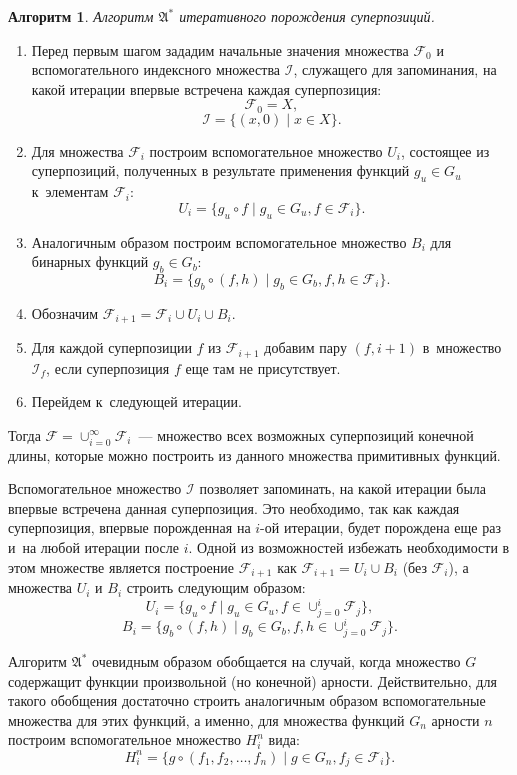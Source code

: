 \documentclass[12pt,a4paper]{amsart}
\newtheorem{algo}{Алгоритм}
\begin{document}
\begin{algo}
  Алгоритм $\mathfrak{A^*}$ итеративного порождения суперпозиций.
\end{algo}
\begin{enumerate}
  \item Перед первым шагом зададим начальные значения множества
	$\mathcal{F}_0$ и вспомогательного индексного множества $\mathcal{I}$,
	служащего для запоминания, на какой итерации впервые встречена
	каждая суперпозиция:
	\[
	  \mathcal{F}_0 = X,
	\]
	\[
	  \mathcal{I} = \{ (x, 0) \mid x \in X \}.
	\]
  \item Для множества $\mathcal{F}_i$ построим вспомогательное множество $U_i$,
	состоящее из суперпозиций, полученных в результате применения функций
	$g_u \in G_u$ к~элементам $\mathcal{F}_i$:
	\[
	  U_i = \{ g_u \circ f \mid g_u \in G_u, f \in \mathcal{F}_i \}.
	\]
  \item Аналогичным образом построим вспомогательное множество $B_i$ для
	бинарных функций $g_b \in G_b$:
	\[
	  B_i = \{ g_b \circ (f, h) \mid g_b \in G_b, f, h \in \mathcal{F}_i \}.
	\]
  \item Обозначим $\mathcal{F}_{i+1} = \mathcal{F}_i \cup U_i \cup B_i$.
  \item Для каждой суперпозиции $f$ из $\mathcal{F}_{i+1}$ добавим пару
	$(f, i+1)$ в~множество $\mathcal{I}_f$, если суперпозиция $f$ еще там
	не присутствует.
  \item Перейдем к~следующей итерации. 
\end{enumerate}

Тогда $\mathcal{F} = \cup_{i=0}^\infty \mathcal{F}_i$~--- множество всех
возможных суперпозиций конечной длины, которые можно построить из
данного множества примитивных функций.

Вспомогательное множество $\mathcal{I}$ позволяет запоминать, на какой
итерации была впервые встречена данная суперпозиция. Это необходимо, так
как каждая суперпозиция, впервые порожденная на $i$-ой итерации, будет
порождена еще раз и~на любой итерации после $i$. Одной из возможностей
избежать необходимости в этом множестве является построение
$\mathcal{F}_{i+1}$ как $\mathcal{F}_{i+1} = U_i \cup B_i$ (без
$\mathcal{F}_i$), а множества $U_i$ и $B_i$ строить следующим образом:
\[
  U_i = \{ g_u \circ f \mid g_u \in G_u, f \in \cup_{j=0}^{i} \mathcal{F}_j \},
\]
\[
  B_i = \{ g_b \circ (f, h) \mid g_b \in G_b, f, h \in \cup_{j=0}^{i} \mathcal{F}_j \}.
\]

Алгоритм $\mathfrak{A^*}$ очевидным образом обобщается на случай, когда
множество $G$ содержащит функции произвольной (но конечной) арности.
Действительно, для такого обобщения достаточно строить аналогичным образом
вспомогательные множества для этих функций, а именно, для множества функций
$G_n$ арности $n$ построим вспомогательное множество $H_i^n$ вида:
\[
H_i^n = \{ g \circ (f_1, f_2, \dots, f_n) \mid g \in G_n, f_j \in \mathcal{F}_i \}.
\]
\end{document}
